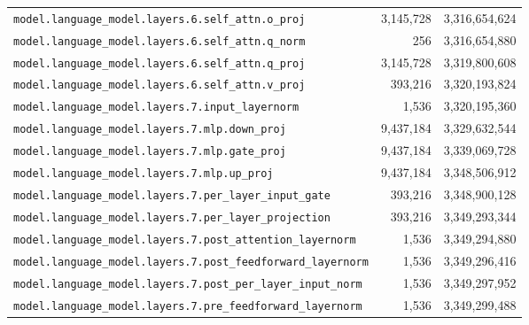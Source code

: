 \documentclass[10pt,a4paper]{article}
\theoremstyle{definition}
\begin{document}
\begin{appendices}
\begin{longtable}{p{9.5cm}rr}
\texttt{model.\allowbreak{}language\_model.\allowbreak{}layers.\allowbreak{}6.\allowbreak{}self\_attn.\allowbreak{}o\_proj} & 3,145,728 & 3,316,654,624 \\
\texttt{model.\allowbreak{}language\_model.\allowbreak{}layers.\allowbreak{}6.\allowbreak{}self\_attn.\allowbreak{}q\_norm} & 256 & 3,316,654,880 \\
\texttt{model.\allowbreak{}language\_model.\allowbreak{}layers.\allowbreak{}6.\allowbreak{}self\_attn.\allowbreak{}q\_proj} & 3,145,728 & 3,319,800,608 \\
\texttt{model.\allowbreak{}language\_model.\allowbreak{}layers.\allowbreak{}6.\allowbreak{}self\_attn.\allowbreak{}v\_proj} & 393,216 & 3,320,193,824 \\
\texttt{model.\allowbreak{}language\_model.\allowbreak{}layers.\allowbreak{}7.\allowbreak{}input\_layernorm} & 1,536 & 3,320,195,360 \\
\texttt{model.\allowbreak{}language\_model.\allowbreak{}layers.\allowbreak{}7.\allowbreak{}mlp.\allowbreak{}down\_proj} & 9,437,184 & 3,329,632,544 \\
\texttt{model.\allowbreak{}language\_model.\allowbreak{}layers.\allowbreak{}7.\allowbreak{}mlp.\allowbreak{}gate\_proj} & 9,437,184 & 3,339,069,728 \\
\texttt{model.\allowbreak{}language\_model.\allowbreak{}layers.\allowbreak{}7.\allowbreak{}mlp.\allowbreak{}up\_proj} & 9,437,184 & 3,348,506,912 \\
\texttt{model.\allowbreak{}language\_model.\allowbreak{}layers.\allowbreak{}7.\allowbreak{}per\_layer\_input\_gate} & 393,216 & 3,348,900,128 \\
\texttt{model.\allowbreak{}language\_model.\allowbreak{}layers.\allowbreak{}7.\allowbreak{}per\_layer\_projection} & 393,216 & 3,349,293,344 \\
\texttt{model.\allowbreak{}language\_model.\allowbreak{}layers.\allowbreak{}7.\allowbreak{}post\_attention\_layernorm} & 1,536 & 3,349,294,880 \\
\texttt{model.\allowbreak{}language\_model.\allowbreak{}layers.\allowbreak{}7.\allowbreak{}post\_feedforward\_layernorm} & 1,536 & 3,349,296,416 \\
\texttt{model.\allowbreak{}language\_model.\allowbreak{}layers.\allowbreak{}7.\allowbreak{}post\_per\_layer\_input\_norm} & 1,536 & 3,349,297,952 \\
\texttt{model.\allowbreak{}language\_model.\allowbreak{}layers.\allowbreak{}7.\allowbreak{}pre\_feedforward\_layernorm} & 1,536 & 3,349,299,488 \\

\end{longtable}
\end{appendices}
\end{document}
